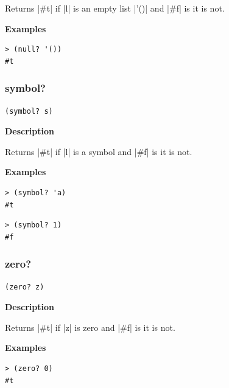 \documentclass[a4paper]{article}
\begin{document}
Returns |#t| if |l| is an empty list |'()| and |#f| is it is not.

\textbf{Examples}

\begin{lstlisting}
> (null? '())
#t
\end{lstlisting}

\subsubsection{symbol?}

\begin{lstlisting}[frame=none]
(symbol? s)
\end{lstlisting}

\textbf{Description}

Returns |#t| if |l| is a symbol and |#f| is it is not.

\textbf{Examples}

\begin{lstlisting}
> (symbol? 'a)
#t
\end{lstlisting}

\begin{lstlisting}
> (symbol? 1)
#f
\end{lstlisting}

\subsubsection{zero?}

\begin{lstlisting}[frame=none]
(zero? z)
\end{lstlisting}

\textbf{Description}

Returns |#t| if |z| is zero and |#f| is it is not.

\textbf{Examples}

\begin{lstlisting}
> (zero? 0)
#t
\end{lstlisting}
\end{document}
